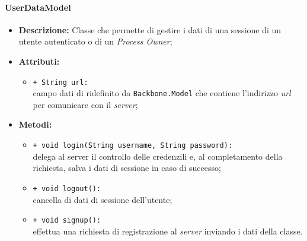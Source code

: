 \paragraph{UserDataModel}
\label{userDataModel}
\begin{flushleft}
\begin{itemize}
\item \textbf{Descrizione:} Classe che permette di gestire i dati di una sessione di un utente autenticato o di un \textit{Process Owner};
\item \textbf{Attributi:}
\begin{sloppypar}
\begin{itemize}
\item \texttt{+ String url:}\\ campo dati di ridefinito da \texttt{Backbone.Model} che contiene l'indirizzo \textit{url} per comunicare con il \textit{server};
\end{itemize}
\end{sloppypar}
\item \textbf{Metodi:}
\begin{sloppypar}
\begin{itemize}
\item \texttt{+ void login(String username, String password):}\\ delega al server il controllo delle credenzili e, al completamento della richiesta, salva i dati di sessione in caso di successo;
\item \texttt{+ void logout():}\\ cancella di dati di sessione dell'utente;
\item \texttt{+ void signup():}\\ effettua una richiesta di registrazione al \textit{server} inviando i dati della classe.
\end{itemize}
\end{sloppypar}
\end{itemize}
\end{flushleft}

